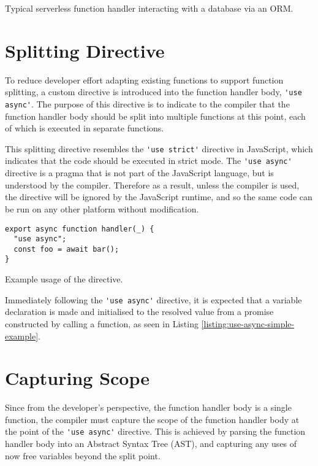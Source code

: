 \begin{listing}[H]
  \inputminted{javascript}{node_modules/@faaas-bench/hello-seq/src/onHttpGetHello.trigger.ts}
  \caption{Typical serverless function handler interacting with a database via an ORM.}
\end{listing}

\section{Splitting Directive}

To reduce developer effort adapting existing functions to support function splitting, a custom directive is introduced into the function handler body, \verb|'use async'|. The purpose of this directive is to indicate to the \faaasc{} compiler that the function handler body should be split into multiple functions at this point, each of which is executed in separate \awslambda{} functions.

This splitting directive resembles the \verb|'use strict'| directive in JavaScript, which indicates that the code should be executed in strict mode. The \verb|'use async'| directive is a pragma that is not part of the JavaScript language, but is understood by the \faaasc{} compiler. Therefore as a result, unless the \faaasc{} compiler is used, the directive will be ignored by the JavaScript runtime, and so the same code can be run on any other \faas{} platform without modification.

\begin{listing}[H]
\begin{verbatim}
export async function handler(_) {
  "use async";
  const foo = await bar();
}
\end{verbatim}
\caption{Example usage of the directive.}
\label{listing:use-async-simple-example}
\end{listing}

Immediately following the \verb|'use async'| directive, it is expected that a variable declaration is made and initialised to the resolved value from a promise constructed by calling a function, as seen in Listing \ref{listing:use-async-simple-example}.

\section{Capturing Scope}

Since from the developer's perspective, the function handler body is a single function, the \faaasc{} compiler must capture the scope of the function handler body at the point of the \verb|'use async'| directive. This is achieved by parsing the function handler body into an Abstract Syntax Tree (AST), and capturing any uses of now free variables beyond the split point.

